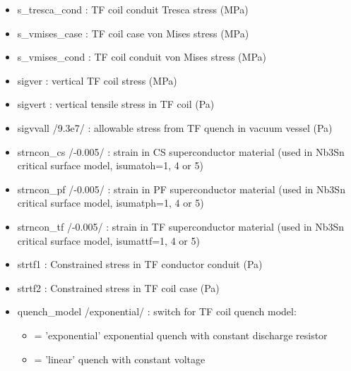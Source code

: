 \documentclass[]{article}
\providecommand{\tightlist}{%
  \setlength{\itemsep}{0pt}\setlength{\parskip}{0pt}}
\begin{document}
\begin{itemize}
\item
  s\_tresca\_cond : TF coil conduit Tresca stress (MPa)
\item
  s\_vmises\_case : TF coil case von Mises stress (MPa)
\item
  s\_vmises\_cond : TF coil conduit von Mises stress (MPa)
\item
  sigver : vertical TF coil stress (MPa)
\item
  sigvert : vertical tensile stress in TF coil (Pa)
\item
  sigvvall /9.3e7/ : allowable stress from TF quench in vacuum vessel
  (Pa)
\item
  strncon\_cs /-0.005/ : strain in CS superconductor material (used in
  Nb3Sn critical surface model, isumatoh=1, 4 or 5)
\item
  strncon\_pf /-0.005/ : strain in PF superconductor material (used in
  Nb3Sn critical surface model, isumatph=1, 4 or 5)
\item
  strncon\_tf /-0.005/ : strain in TF superconductor material (used in
  Nb3Sn critical surface model, isumattf=1, 4 or 5)
\item
  strtf1 : Constrained stress in TF conductor conduit (Pa)
\item
  strtf2 : Constrained stress in TF coil case (Pa)
\item
  quench\_model /exponential/ : switch for TF coil quench model:

  \begin{itemize}
  \tightlist
  \item
    = 'exponential' exponential quench with constant discharge resistor
  \item
    = 'linear' quench with constant voltage
  \end{itemize}


\end{itemize}
\end{document}
